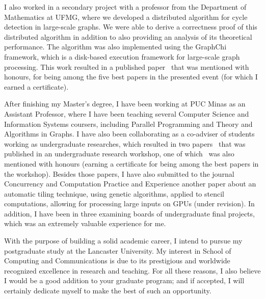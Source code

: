 \documentclass{article}
\begin{document}
I also worked in a secondary project with a professor from the Department of
Mathematics at UFMG, where we developed a distributed algorithm for cycle
detection in large-scale graphs. We were able to derive a correctness proof of
this distributed algorithm in addition to also providing an analysis of its
theoretical performance.  The algorithm was also implemented using the GraphChi
framework, which is a disk-based execution framework for large-scale graph
processing. This work resulted in a published paper~\cite{rocha2015cycles} that
was mentioned with honours, for being among the five best papers in the
presented event (for which I earned a certificate).

After finishing my Master's degree, I have been working at PUC Minas as an
Assistant Professor, where I have been teaching several Computer Science and
Information Systems coursers, including Parallel Programming and Theory and
Algorithms in Graphs.  I have also been collaborating as a co-adviser of
students working as undergraduate researches, which resulted in two
papers~\cite{saffran2015apriori,pereira2015stencilbench} that was published in
an undergraduate research workshop, one of which~\cite{pereira2015stencilbench}
was also mentioned with honours (earning a certificate for being among the best
papers in the workshop). Besides those papers, I have also submitted to the
journal Concurrency and Computation Practice and Experience another paper about
an automatic tiling technique, using genetic algorithms, applied to stencil
computations, allowing for processing large inputs on GPUs (under revision).
In addition, I have been in three examining boards of undergraduate final
projects, which was an extremely valuable experience for me.


With the purpose of building a solid academic career, I intend to pursue my
postgraduate study at the Lancaster University.  My interest in School of
Computing and Communications is due to its prestigious and worldwide recognized
excellence in research and teaching. For all these reasons, I also believe I
would be a good addition to your graduate program; and if accepted, I will
certainly dedicate myself to make the best of such an opportunity.

\nocite{*}


\end{document}
